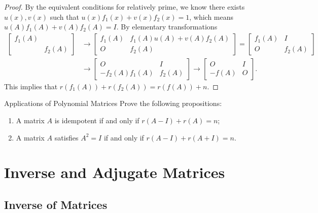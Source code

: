 \begin{proof}
  By the equivalent conditions for relatively prime, we know there exists $u(x),
  v(x)$ such that $u(x)f_1(x) + v(x)f_2(x) = 1$,
  which means $u(A)f_1(A) + v(A)f_2(A) = I$.
  By elementary transformations
  \begin{align}
    \left[
      \begin{array}{cc}
        f_1(A)&\\
        &f_2(A)
      \end{array}
    \right] &\rightarrow \left[
      \begin{array}{cc}
        f_1(A)&f_1(A)u(A) + v(A)f_2(A)\\
        O&f_2(A)
      \end{array}
    \right] = \left[
      \begin{array}{cc}
        f_1(A)&I\\
        O&f_2(A)
      \end{array}
    \right]\\
    &\rightarrow \left[
      \begin{array}{cc}
        O&I\\
        -f_2(A)f_1(A)& f_2(A)
      \end{array}
    \right] \rightarrow \left[
      \begin{array}{cc}
        O&I\\
        -f(A)&O
      \end{array}
    \right].
  \end{align}
  This implies that $r(f_1(A)) + r(f_2(A)) = r(f(A)) + n$.
\end{proof}

\begin{example}{Applications of Polynomial Matrices}{}
  Prove the following propositions:
  \begin{enumerate}
  \item A matrix $A$ is idempotent if and only if $r(A - I) + r(A) = n$;
  \item A matrix $A$ satisfies $A^2 = I$ if and only if $r(A - I) + r(A + I) = n$.
  \end{enumerate}
\end{example}


\section{Inverse and Adjugate Matrices}

\subsection{Inverse of Matrices}

